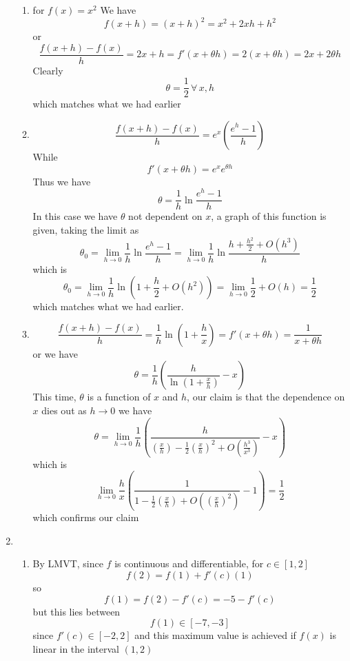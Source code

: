 \documentclass[12pt]{article}
\begin{document}
\begin{enumerate}
		\begin{enumerate}

			\item
				for $f(x) = x^2$
				We have
				$$
				f(x + h) = (x+h)^{2} = x^{2} + 2xh + h^{2}
				$$
				or 
				$$
				\frac{f(x + h)-f(x)}{h} = 2x + h = f'(x + \theta h) = 2(x + \theta h) = 2x + 2\theta h
				$$
				Clearly
				$$
				\theta = \frac{1}{2} \, \forall \,x, h
				$$
				which matches what we had earlier
			\item
				$$
				\frac{f(x + h)-f(x)}{h} = e^{ x }\left(  \frac{e^{ h }-1}{h} \right)
				$$
				While
				$$
				f'(x + \theta h) = e^{ x }e^{ \theta h }
				$$
				Thus we have
				$$
				\theta = \frac{1}{h} \ln \frac{e^{ h }-1}{h}
				$$
				In this case we have $\theta$ not dependent on $x$, a graph of this function is given, taking the limit as
				$$
				\theta_{0} = \lim_{ h \to 0 } \frac{1}{h} \ln \frac{e^{ h }-1}{h} = \lim_{ h \to 0 } \frac{1}{h}\ln \frac{h + \frac{h^{2}}{2} +O(h^{3})}{h}
				$$
				which is
				$$
				\theta_{0} = \lim_{ h \to 0 }\frac{1}{h} \ln \left( 1 + \frac{h}{2} + O(h^{2}) \right) = \lim_{ h \to 0 } \frac{1}{2} + O(h)  = \frac{1}{2}
				$$
				which matches what we had earlier.

			\item
				$$
				\frac{f(x+h)-f(x)}{h} = \frac{1}{h}\ln \left( 1 + \frac{h}{x}\right) = f'(x + \theta h) = \frac{1}{x + \theta h}
				$$
				or we have
				$$
				\theta = \frac{1}{h}\left( \frac{h}{\ln \left( 1 + \frac{x}{h} \right)}-x \right)
				$$
				This time, $\theta$ is a function of $x$ and $h$, our claim is that the dependence on $x$ dies out as $h \to 0$ we have
				$$
				\theta = \lim_{ h \to 0 } \frac{1}{h}\left( \frac{h}{\left( \frac{x}{h}  \right)-\frac{1}{2}\left( \frac{x}{h} \right)^{2} +O\left( \frac{h^{3}}{x^{3}} \right)}  -x\right)
				$$
				which is
				$$
				\lim_{ h \to 0 } \frac{h}{x}\left( \frac{1}{1-\frac{1}{2}\left( \frac{x}{h} \right)+O\left( \left( \frac{x}{h} \right)^{2} \right)}-1 \right) = \frac{1}{2}
				$$
				which confirms our claim
		\end{enumerate}

	\item
		\begin{enumerate}

			\item
				By LMVT, since $f$ is continuous and differentiable, for $c \in [1,2]$
				$$
				f(2) = f(1) + f'(c)(1)
				$$
				so
				$$
				f(1) = f(2) - f'(c) = -5 -f'(c)
				$$
				but this lies between
				$$
				f(1) \in [-7,-3]
				$$
				since $f'(c) \in [-2,2]$ and this maximum value is achieved if $f(x)$ is linear in the interval $(1,2)$


\end{enumerate}
\end{enumerate}
\end{document}
